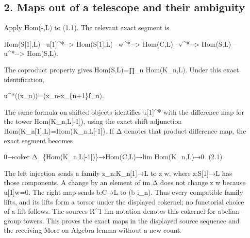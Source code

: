 \subsection{2. Maps out of a telescope and their ambiguity}\label{proofs-10139-10427-maps-out-of-a-telescope-and-their-ambiguity}

Apply Hom(-,\allowbreak{}L)\allowbreak{} to (1.1)\allowbreak{}. The relevant exact segment is

Hom(S[1]\allowbreak{},\allowbreak{}L)\allowbreak{} --u[1]\allowbreak{}\textasciicircum{}*-\allowbreak{}-> Hom(S[1]\allowbreak{},\allowbreak{}L)\allowbreak{} --w\textasciicircum{}*-\allowbreak{}-> Hom(C,\allowbreak{}L)\allowbreak{} --v\textasciicircum{}*-\allowbreak{}-> Hom(S,\allowbreak{}L)\allowbreak{} --u\textasciicircum{}*-\allowbreak{}-> Hom(S,\allowbreak{}L)\allowbreak{}.

The coproduct property gives Hom(S,\allowbreak{}L)\allowbreak{}\allowbreak{}=∏\_\allowbreak{}n Hom(K\_\allowbreak{}n,\allowbreak{}L)\allowbreak{}. Under this exact identification,\allowbreak{}

u\textasciicircum{}*((x\_\allowbreak{}n)\allowbreak{})\allowbreak{}\allowbreak{}=(x\_\allowbreak{}n-x\_\allowbreak{}\{n\allowbreak{}+1\}f\_\allowbreak{}n)\allowbreak{}.

The same formula on shifted objects identifies u[1]\allowbreak{}\textasciicircum{}* with the difference map for the tower Hom(K\_\allowbreak{}n,\allowbreak{}L[-1]\allowbreak{})\allowbreak{},\allowbreak{} using the exact shift adjunction Hom(K\_\allowbreak{}n[1]\allowbreak{},\allowbreak{}L)\allowbreak{}\allowbreak{}=Hom(K\_\allowbreak{}n,\allowbreak{}L[-1]\allowbreak{})\allowbreak{}. If Δ denotes that product difference map,\allowbreak{} the exact segment becomes

0\allowbreak{}→coker Δ\_\allowbreak{}\{Hom(K\_\allowbreak{}n,\allowbreak{}L[-1]\allowbreak{})\allowbreak{}\}\allowbreak{}→Hom(C,\allowbreak{}L)\allowbreak{}\allowbreak{}→lim Hom(K\_\allowbreak{}n,\allowbreak{}L)\allowbreak{}\allowbreak{}→0. (2.1)\allowbreak{}

The left injection sends a family z\_\allowbreak{}n:\allowbreak{}K\_\allowbreak{}n[1]\allowbreak{}\allowbreak{}→L to z w,\allowbreak{} where z:\allowbreak{}S[1]\allowbreak{}\allowbreak{}→L has those components. A change by an element of im Δ does not change z w because u[1]\allowbreak{}w\allowbreak{}=0. The right map sends b:\allowbreak{}C\allowbreak{}→L to (b i\_\allowbreak{}n)\allowbreak{}. Thus every compatible family lifts,\allowbreak{} and its lifts form a torsor under the displayed cokernel; no functorial choice of a lift follows. The source\textquotesingle s R\^{}1 lim notation denotes this cokernel for abelian-group towers. This proves the exact maps in the displayed source sequence and the receiving More on Algebra lemma without a new count.

